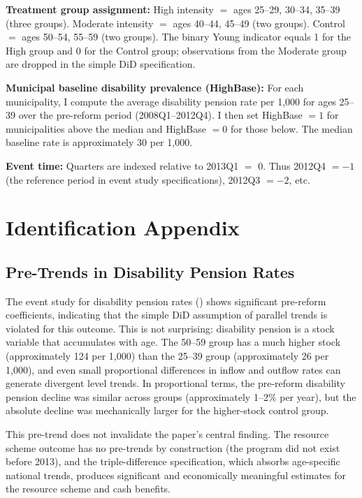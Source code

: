 \documentclass[12pt]{article}
\begin{document}
\textbf{Treatment group assignment:} High intensity $=$ ages 25--29, 30--34, 35--39 (three groups). Moderate intensity $=$ ages 40--44, 45--49 (two groups). Control $=$ ages 50--54, 55--59 (two groups). The binary Young indicator equals 1 for the High group and 0 for the Control group; observations from the Moderate group are dropped in the simple DiD specification.

\textbf{Municipal baseline disability prevalence (HighBase):} For each municipality, I compute the average disability pension rate per 1,000 for ages 25--39 over the pre-reform period (2008Q1--2012Q4). I then set HighBase $= 1$ for municipalities above the median and HighBase $= 0$ for those below. The median baseline rate is approximately 30 per 1,000.

\textbf{Event time:} Quarters are indexed relative to 2013Q1 $=$ 0. Thus 2012Q4 $= -1$ (the reference period in event study specifications), 2012Q3 $= -2$, etc.


\section{Identification Appendix}
\label{sec:app_id}

\subsection{Pre-Trends in Disability Pension Rates}

The event study for disability pension rates () shows significant pre-reform coefficients, indicating that the simple DiD assumption of parallel trends is violated for this outcome. This is not surprising: disability pension is a stock variable that accumulates with age. The 50--59 group has a much higher stock (approximately 124 per 1,000) than the 25--39 group (approximately 26 per 1,000), and even small proportional differences in inflow and outflow rates can generate divergent level trends. In proportional terms, the pre-reform disability pension decline was similar across groups (approximately 1--2\% per year), but the absolute decline was mechanically larger for the higher-stock control group.

This pre-trend does not invalidate the paper's central finding. The resource scheme outcome has no pre-trends by construction (the program did not exist before 2013), and the triple-difference specification, which absorbs age-specific national trends, produces significant and economically meaningful estimates for the resource scheme and cash benefits.
\end{document}
